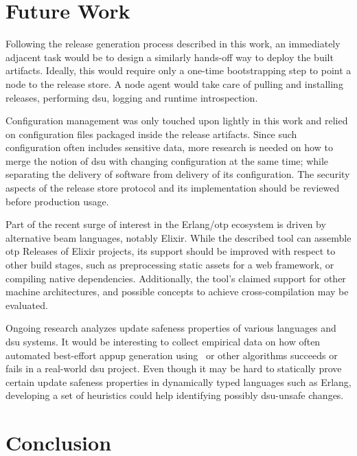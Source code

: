 \cleardoublepage
\section{Future Work}

Following the release generation process described in this work, an immediately adjacent task would be to design a similarly hands-off way to deploy the built artifacts. Ideally, this would require only a one-time bootstrapping step to point a node to the release store. A node agent would take care of pulling and installing releases, performing \acrshort{dsu}, logging and runtime introspection.

Configuration management was only touched upon lightly in this work and relied on configuration files packaged inside the release artifacts. Since such configuration often includes sensitive data, more research is needed on how to merge the notion of \acrshort{dsu} with changing configuration at the same time; while separating the delivery of software from delivery of its configuration. The security aspects of the release store protocol and its implementation should be reviewed before production usage.

Part of the recent surge of interest in the Erlang/\acrshort{otp} ecosystem is driven by alternative \acrshort{beam} languages, notably Elixir. While the described tool can assemble \acrshort{otp} Releases of Elixir projects, its support should be improved with respect to other build stages, such as preprocessing static assets for a web framework, or compiling native dependencies. Additionally, the tool's claimed support for other machine architectures, and possible concepts to achieve cross-compilation may be evaluated.

Ongoing research analyzes update safeness properties of various languages and \acrshort{dsu} systems. It would be interesting to collect empirical data on how often automated best-effort \acrshort{appup} generation using~\cite{rebar3appup} or other algorithms succeeds or fails in a real-world \acrshort{dsu} project. Even though it may be hard to statically prove certain update safeness properties in dynamically typed languages such as Erlang, developing a set of heuristics could help identifying possibly \acrshort{dsu}-unsafe changes.

\cleardoublepage
\section{Conclusion}

